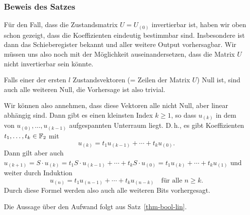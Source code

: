 \begin{refsegment}
\subsubsection*{Beweis des Satzes}

Für den Fall, dass die Zustandsmatrix $U = U_{(0)}$ invertierbar ist,
haben wir oben schon gezeigt, dass die Koeffizienten eindeutig bestimmbar sind.
Insbesondere ist dann das Schieberegister bekannt und aller weitere Output
vorhersagbar. Wir müssen uns also noch mit der Möglichkeit auseinandersetzen,
dass die Matrix $U$ nicht invertierbar sein könnte.

Falls einer der ersten $l$ Zustandsvektoren (= Zeilen der Matrix $U$)
Null ist, sind auch alle weiteren Null, die Vorhersage ist also trivial.

Wir können also annehmen, dass diese Vektoren alle nicht Null, aber linear
abhängig sind. Dann gibt es einen kleinsten Index $k \geq 1$, so dass
$u_{(k)}$ in dem von $u_{(0)}, \ldots, u_{(k-1)}$ aufgespannten
Unterraum liegt. D.\,h., es gibt Koeffizienten $t_1, \ldots, t_k \in \mathbb{F}_2$ mit
\[
     u_{(k)}  =  t_1 u_{(k-1)} + \cdots + t_k u_{(0)}.
\]
Dann gilt aber auch $u_{(k+1)} = S\cdot u_{(k)} =
t_1 S\cdot u_{(k-1)} + \cdots + t_k S\cdot u_{(0)} =
t_1 u_{(k)} + \cdots + t_k u_{(1)}$ und weiter durch Induktion
\[
     u_{(n)}  =  t_1 u_{(n-1)} + \cdots + t_k u_{(n-k)}
     \quad \text{für alle } n \geq k.
\]
Durch diese Formel werden also auch alle weiteren Bits vorhergesagt.

Die Aussage über den Aufwand folgt aus Satz~\ref{thm-bool-lin}.


\end{refsegment}
